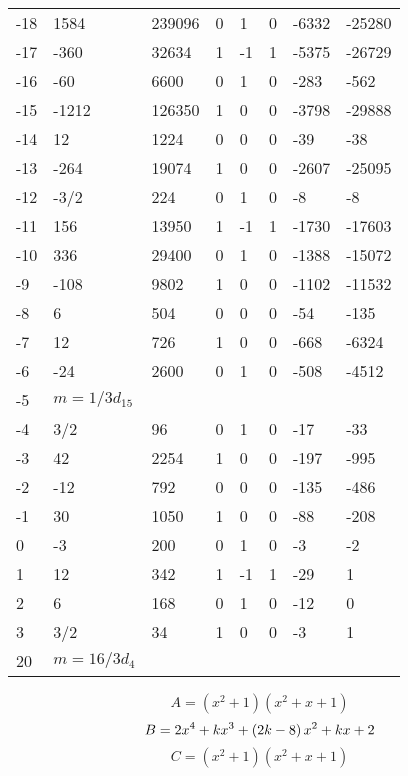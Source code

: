 \documentclass{amsart}
\begin{document}
\begin{longtable}{|l|l|l|lllll|}
-18&1584&239096&0&1&0&-6332&-25280\\
-17&-360&32634&1&-1&1&-5375&-26729\\
-16&-60&6600&0&1&0&-283&-562\\
-15&-1212&126350&1&0&0&-3798&-29888\\
-14&12&1224&0&0&0&-39&-38\\
-13&-264&19074&1&0&0&-2607&-25095\\
-12&-3/2&224&0&1&0&-8&-8\\
-11&156&13950&1&-1&1&-1730&-17603\\
-10&336&29400&0&1&0&-1388&-15072\\
-9&-108&9802&1&0&0&-1102&-11532\\
-8&6&504&0&0&0&-54&-135\\
-7&12&726&1&0&0&-668&-6324\\
-6&-24&2600&0&1&0&-508&-4512\\
-5&$m=1/3d_{15}$&&\multicolumn{5}{c|}{}\\
-4&3/2&96&0&1&0&-17&-33\\
-3&42&2254&1&0&0&-197&-995\\
-2&-12&792&0&0&0&-135&-486\\
-1&30&1050&1&0&0&-88&-208\\
0&-3&200&0&1&0&-3&-2\\
1&12&342&1&-1&1&-29&1\\
2&6&168&0&1&0&-12&0\\
3&3/2&34&1&0&0&-3&1\\
20&$m=16/3d_{4}$&&\multicolumn{5}{c|}{}\\
\hline
\end{longtable}
$$A=(x^2
 + 1)(x^2
 + x
 + 1)$$
$$B=2\*x^4
 + k\*x^3
 + \left(2\*k
 - 8\right) \*x^2
 + k\*x
 + 2$$
$$C=(x^2
 + 1)(x^2
 + x
 + 1)$$
\end{document}
